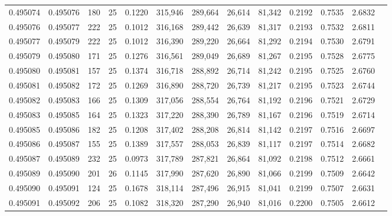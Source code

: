 \begin{tabular}{rrrrrrrrrrrrr}
0.495074 & 0.495076 &   180 &  25 &                                     0.1220 & 315,946 & 289,664 &  26,614 &  81,342 & 0.2192 & 0.7535 & 2.6832 \\
0.495076 & 0.495077 &   222 &  25 &                                     0.1012 & 316,168 & 289,442 &  26,639 &  81,317 & 0.2193 & 0.7532 & 2.6811 \\
0.495077 & 0.495079 &   222 &  25 &                                     0.1012 & 316,390 & 289,220 &  26,664 &  81,292 & 0.2194 & 0.7530 & 2.6791 \\
0.495079 & 0.495080 &   171 &  25 &                                     0.1276 & 316,561 & 289,049 &  26,689 &  81,267 & 0.2195 & 0.7528 & 2.6775 \\
0.495080 & 0.495081 &   157 &  25 &                                     0.1374 & 316,718 & 288,892 &  26,714 &  81,242 & 0.2195 & 0.7525 & 2.6760 \\
0.495081 & 0.495082 &   172 &  25 &                                     0.1269 & 316,890 & 288,720 &  26,739 &  81,217 & 0.2195 & 0.7523 & 2.6744 \\
0.495082 & 0.495083 &   166 &  25 &                                     0.1309 & 317,056 & 288,554 &  26,764 &  81,192 & 0.2196 & 0.7521 & 2.6729 \\
0.495083 & 0.495085 &   164 &  25 &                                     0.1323 & 317,220 & 288,390 &  26,789 &  81,167 & 0.2196 & 0.7519 & 2.6714 \\
0.495085 & 0.495086 &   182 &  25 &                                     0.1208 & 317,402 & 288,208 &  26,814 &  81,142 & 0.2197 & 0.7516 & 2.6697 \\
0.495086 & 0.495087 &   155 &  25 &                                     0.1389 & 317,557 & 288,053 &  26,839 &  81,117 & 0.2197 & 0.7514 & 2.6682 \\
0.495087 & 0.495089 &   232 &  25 &                                     0.0973 & 317,789 & 287,821 &  26,864 &  81,092 & 0.2198 & 0.7512 & 2.6661 \\
0.495089 & 0.495090 &   201 &  26 &                                     0.1145 & 317,990 & 287,620 &  26,890 &  81,066 & 0.2199 & 0.7509 & 2.6642 \\
0.495090 & 0.495091 &   124 &  25 &                                     0.1678 & 318,114 & 287,496 &  26,915 &  81,041 & 0.2199 & 0.7507 & 2.6631 \\
0.495091 & 0.495092 &   206 &  25 &                                     0.1082 & 318,320 & 287,290 &  26,940 &  81,016 & 0.2200 & 0.7505 & 2.6612 \\

\end{tabular}
